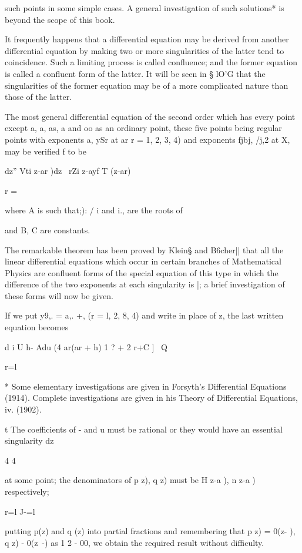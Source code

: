 %
%

such points in some simple cases. A general investigation of such
solutions* is beyond the scope of this book.

It frequently happens that a differential equation may be derived from
another differential equation by making two or more singularities of
the latter tend to coincidence. Such a limiting process is called
confluence; and the former equation is called a confluent form of the
latter. It will be seen in § lO'G that the singularities of the former
equation may be of a more complicated nature than those of the latter.


The most general differential equation of the second order which has
every point except a, a, as, a and oo as an ordinary point, these
five points being regular points with exponents a, ySr at ar r = 1,
2, 3, 4) and exponents fjbj, /j,2 at X, may be verified f to be

dz'' Vti z-ar )dz \ rZi z-ayf T (z-ar)

r = \

where A is such that;): / i and i., are the roots of

and B, C are constants.

The remarkable theorem has been proved by Klein§ and B6cher|| that all
the linear differential equations which occur in certain branches of
Mathematical Physics are confluent forms of the special equation of
this type in which the difference of the two exponents at each
singularity is |; a brief investigation of these forms will now be
given.

If we put y9,. = a,. +, (r = l, 2, 8, 4) and write in place of z, the
last written equation becomes

d i U h- Adu (4 ar(ar + h) 1 ? + 2 r+C ] \ Q

r=l

* Some elementary investigations are given in Forsyth's Differential
Equations (1914). Complete investigations are given in his Theory of
Differential Equations, iv. (1902).

t The coefficients of - and u must be rational or they would have an
essential singularity dz

4 4

at some point; the denominators of p z), q z) must be H z-a ), n z-a )
respectively;

r=l J-=l

putting p(z) and q (z) into partial fractions and remembering that p
z) = 0(z- ), q z) - 0(z~-) as 1 2 - 00, we obtain the required result
without difficulty.

